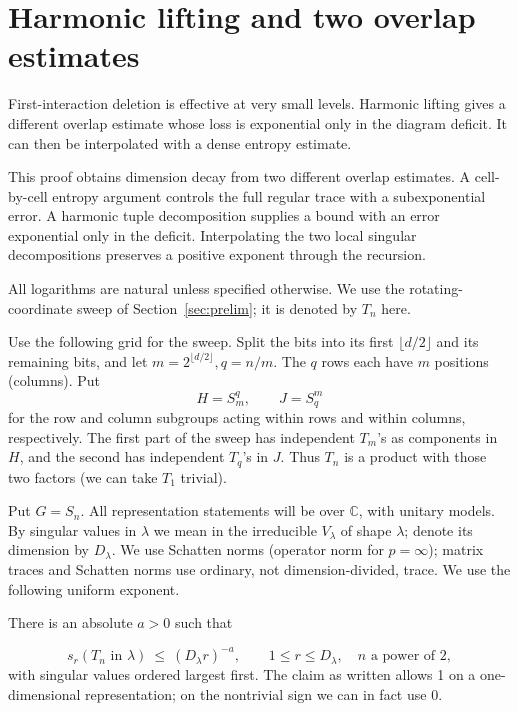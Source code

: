 \section{Harmonic lifting and two overlap estimates}\label{tra:harmonic-overlaps}

First-interaction deletion is effective at very small levels. Harmonic lifting gives a different overlap estimate whose loss is exponential only in the diagram deficit. It can then be interpolated with a dense entropy estimate.

This proof obtains dimension decay from two different overlap estimates. A cell-by-cell entropy argument controls the full regular trace with a subexponential error. A harmonic tuple decomposition supplies a bound with an error exponential only in the deficit. Interpolating the two local singular decompositions preserves a positive exponent through the recursion.

All logarithms are natural unless specified otherwise. We use the rotating-coordinate sweep of Section~\ref{sec:prelim}; it is denoted by $T_n$ here.

Use the following grid for the sweep. Split the bits into its first \(\lfloor d/2\rfloor\) and its remaining bits, and let \(m=2^{\lfloor d/2\rfloor}, q=n/m\). The \(q\) rows each have \(m\) positions (columns). Put
\[
          H=S_m^q,\qquad J=S_q^m
\]
for the row and column subgroups acting within rows and within columns, respectively. The first part of the sweep has independent \(T_m\)'s as components in \(H\), and the second has independent \(T_q\)'s in \(J\). Thus \(T_n\) is a product with those two factors (we can take \(T_1\) trivial).

\label{tra:harmonic-overlaps:setup}
Put $G=S_n$. All representation statements will be over \(\mathbb C\), with unitary models. By singular values in \(\lambda\) we mean in the irreducible \(V_\lambda\) of shape \(\lambda\); denote its dimension by \(D_\lambda\). We use Schatten norms (operator norm for \(p=\infty\)); matrix traces and Schatten norms use ordinary, not dimension-divided, trace. We use the following uniform exponent.

\begin{theorem}\label{tra:harmonic-overlaps:singular}
There is an absolute $a>0$ such that

\label{tra:harmonic-overlaps:all-index-conclusion}
\begin{equation}
 s_r(T_n\text{ in }\lambda)\ \le\ (D_\lambda r)^{-a},
 \qquad 1\le r\le D_\lambda,\quad n\text{ a power of }2,             \label{tra:harmonic-overlaps:eq1}
\end{equation}
with singular values ordered largest first. The claim as written allows 1 on a one-dimensional representation; on the nontrivial sign we can in fact use 0.

\end{theorem}

